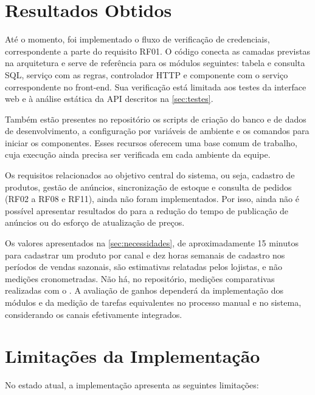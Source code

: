 \section{Resultados Obtidos}
\label{sec:resultados}

Até o momento, foi implementado o fluxo de verificação de credenciais, correspondente a parte do requisito RF01. O código conecta as camadas previstas na arquitetura e serve de referência para os módulos seguintes: tabela e consulta SQL, serviço com as regras, controlador HTTP e componente com o serviço correspondente no front-end. Sua verificação está limitada aos testes da interface web e à análise estática da API descritos na \autoref{sec:testes}.

Também estão presentes no repositório os scripts de criação do banco e de dados de desenvolvimento, a configuração por variáveis de ambiente e os comandos para iniciar os componentes. Esses recursos oferecem uma base comum de trabalho, cuja execução ainda precisa ser verificada em cada ambiente da equipe.

Os requisitos relacionados ao objetivo central do sistema, ou seja, cadastro de produtos, gestão de anúncios, sincronização de estoque e consulta de pedidos (RF02 a RF08 e RF11), ainda não foram implementados. Por isso, ainda não é possível apresentar resultados do \sistema{} para a redução do tempo de publicação de anúncios ou do esforço de atualização de preços.

Os valores apresentados na \autoref{sec:necessidades}, de aproximadamente 15 minutos para cadastrar um produto por canal e dez horas semanais de cadastro nos períodos de vendas sazonais, são estimativas relatadas pelos lojistas, e não medições cronometradas. Não há, no repositório, medições comparativas realizadas com o \sistema{}. A avaliação de ganhos dependerá da implementação dos módulos e da medição de tarefas equivalentes no processo manual e no sistema, considerando os canais efetivamente integrados.

\section{Limitações da Implementação}
\label{sec:limitacoes}

No estado atual, a implementação apresenta as seguintes limitações:

